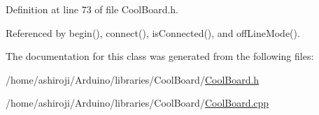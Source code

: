Definition at line 73 of file Cool\+Board.\+h.



Referenced by begin(), connect(), is\+Connected(), and off\+Line\+Mode().



The documentation for this class was generated from the following files\+:\begin{DoxyCompactItemize}
\item 
/home/ashiroji/\+Arduino/libraries/\+Cool\+Board/\hyperlink{CoolBoard_8h}{Cool\+Board.\+h}\item 
/home/ashiroji/\+Arduino/libraries/\+Cool\+Board/\hyperlink{CoolBoard_8cpp}{Cool\+Board.\+cpp}\end{DoxyCompactItemize}
